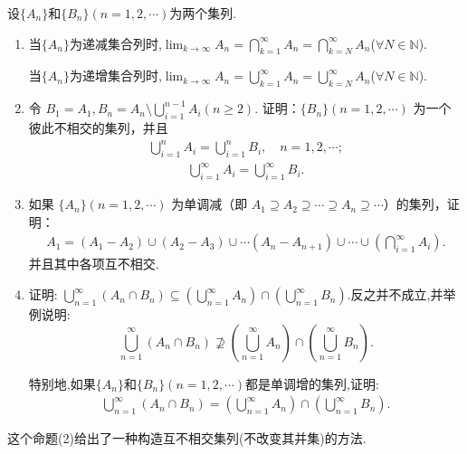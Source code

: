 \documentclass[../../main.tex]{subfiles}%
\begin{document}
\begin{proposition}\label{proposition:单调集合上下限的一般形式}
设$\{A_n\}$和$\{B_n\}(n=1,2,\cdots)$为两个集列.
\begin{enumerate}[(1)]
\item 当$\{A_n\}$为递减集合列时,$\lim_{k\to \infty}A_n=\bigcap_{k=1}^{\infty}A_n=\bigcap_{k=N}^{\infty}A_n$($\forall N\in \mathbb{N}$).

当$\{A_n\}$为递增集合列时,$\lim_{k\to \infty}A_n=\bigcup_{k=1}^{\infty}A_n=\bigcup_{k=N}^{\infty}A_n$($\forall N\in \mathbb{N}$).

\item 
令 $B_1 = A_1,B_n = A_n \setminus \bigcup\limits_{i=1}^{n-1}A_i(n\geqslant 2)$. 证明：$\{B_n\}(n = 1,2,\cdots)$ 为一个彼此不相交的集列，并且
\begin{align*}
\bigcup_{i=1}^{n} A_i = \bigcup_{i=1}^{n} B_i,\quad n = 1,2,\cdots;
\end{align*}
\begin{align*}
\bigcup_{i=1}^{\infty} A_i = \bigcup_{i=1}^{\infty} B_i.
\end{align*}

\item 
如果 $\{A_n\}(n=1,2,\cdots)$ 为单调减（即 $A_1\supseteq A_2\supseteq\cdots\supseteq A_n\supseteq\cdots$）的集列，证明：
\begin{align*}
A_1 = (A_1 - A_2) \cup (A_2 - A_3) \cup \cdots(A_n - A_{n+1}) \cup \cdots \cup \left( \bigcap_{i=1}^{\infty} A_i \right).
\end{align*}
并且其中各项互不相交.

\item 证明: $\bigcup_{n=1}^{\infty} (A_n \cap B_n) \subseteq \left( \bigcup_{n=1}^{\infty} A_n \right) \cap \left( \bigcup_{n=1}^{\infty} B_n \right).$反之并不成立,并举例说明:
$$\bigcup_{n=1}^{\infty} (A_n \cap B_n) \nsupseteq \left( \bigcup_{n=1}^{\infty} A_n \right) \cap \left( \bigcup_{n=1}^{\infty} B_n \right).$$

特别地,如果$\{A_n\}$和$\{B_n\}(n=1,2,\cdots)$都是单调增的集列,证明:
\begin{align*}
\bigcup_{n=1}^{\infty} (A_n \cap B_n) = \left( \bigcup_{n=1}^{\infty} A_n \right) \cap \left( \bigcup_{n=1}^{\infty} B_n \right).
\end{align*}
\end{enumerate}
\end{proposition}
\begin{note}
这个命题(2)给出了一种构造互不相交集列(不改变其并集)的方法.
\end{note}
\end{document}
